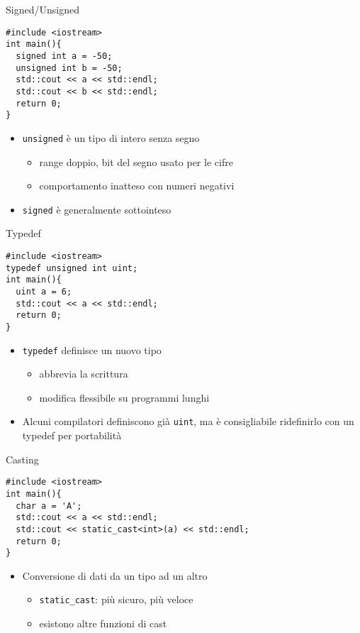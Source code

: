 \begin{frame}[fragile]{Signed/Unsigned}
  \vfill
  \begin{lstlisting}
#include <iostream>
int main(){
  signed int a = -50;
  unsigned int b = -50;
  std::cout << a << std::endl;
  std::cout << b << std::endl;
  return 0;
}
  \end{lstlisting}
  \vfill
  \begin{itemize}
    \item \lstinline$unsigned$ è un tipo di intero senza segno
    \begin{itemize}
      \item range doppio, bit del segno usato per le cifre
      \item comportamento inatteso con numeri negativi
    \end{itemize}
    \vfill
    \item \lstinline$signed$ è generalmente sottointeso
  \end{itemize}
  \vfill
\end{frame}

\begin{frame}[fragile]{Typedef}
  \vfill
  \begin{lstlisting}
#include <iostream>
typedef unsigned int uint;
int main(){
  uint a = 6;
  std::cout << a << std::endl;
  return 0;
}
  \end{lstlisting}
  \vfill
  \begin{itemize}
    \item \lstinline$typedef$ definisce un nuovo tipo
    \begin{itemize}
      \item abbrevia la scrittura
      \item modifica flessibile su programmi lunghi
    \end{itemize}
    \vfill
    \item Alcuni compilatori definiscono già \lstinline$uint$, ma è consigliabile
    ridefinirlo con un typedef per portabilità
  \end{itemize}
  \vfill
\end{frame}

\begin{frame}[fragile]{Casting}
  \vfill
  \begin{lstlisting}
#include <iostream>
int main(){
  char a = 'A';
  std::cout << a << std::endl;
  std::cout << static_cast<int>(a) << std::endl;
  return 0;
}
  \end{lstlisting}
  \vfill
  \begin{itemize}
    \item Conversione di dati da un tipo ad un altro
    \begin{itemize}
      \item \lstinline$static_cast$: più sicuro, più veloce
      \item esistono altre funzioni di cast
    \end{itemize}
  \end{itemize}
  \vfill
\end{frame}

